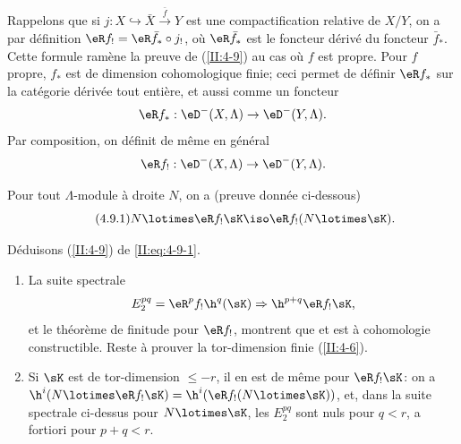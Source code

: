 Rappelons que si $j:X\hookrightarrow \bar X \xrightarrow{\bar f} Y$ est une 
compactification relative de $X/Y$, on a par définition 
$\eR f_! = \eR \bar f_* \circ j_!$, où $\eR \bar f_*$ est le foncteur dérivé 
du foncteur $\bar f_*$. Cette formule ramène la preuve de (\ref{II:4-9}) 
au cas où $f$ est propre. Pour $f$ propre, $f_*$ est de dimension 
cohomologique finie; ceci permet de définir $\eR f_*$ sur la catégorie 
dérivée tout entière, et aussi comme un foncteur 
\[
  \eR f_* : \eD^-(X,\Lambda) \to \eD^-(Y,\Lambda) \text{.}
\]
Par composition, on définit de même en général 
\[
  \eR f_! : \eD^-(X,\Lambda) \to \eD^-(Y,\Lambda) \text{.}
\]

Pour tout $\Lambda$-module à droite $N$, on a (preuve donnée ci-dessous) 
\begin{equation*}\tag{4.9.1}\label{II:eq:4-9-1}
  N\lotimes \eR f_! \sK \iso \eR f_! (N\lotimes \sK) \text{.}
\end{equation*}

Déduisons (\ref{II:4-9}) de \eqref{II:eq:4-9-1}. 
\begin{enumerate}[\indent a)]
  \item La suite spectrale 
    \[
      E_2^{p q} = \eR^p f_! \h^q(\sK) \Rightarrow \h^{p+q} \eR f_! \sK \text{,}
    \]
    et le théorème de finitude pour $\eR f_!$, montrent que 
     et est à cohomologie constructible. 
    Reste à prouver la tor-dimension finie (\ref{II:4-6}). 
  \item Si $\sK$ est de tor-dimension $\leqslant -r$, il en est de même pour 
    $\eR f_! \sK$: on a $\h^i(N\lotimes \eR f_! \sK) = \h^i(\eR f_!(N\lotimes \sK))$, 
    et, dans la suite spectrale ci-dessus pour $N\lotimes \sK$, les 
    $E_2^{p q}$ sont nuls pour $q<r$, a fortiori pour $p+q<r$. 
\end{enumerate}

